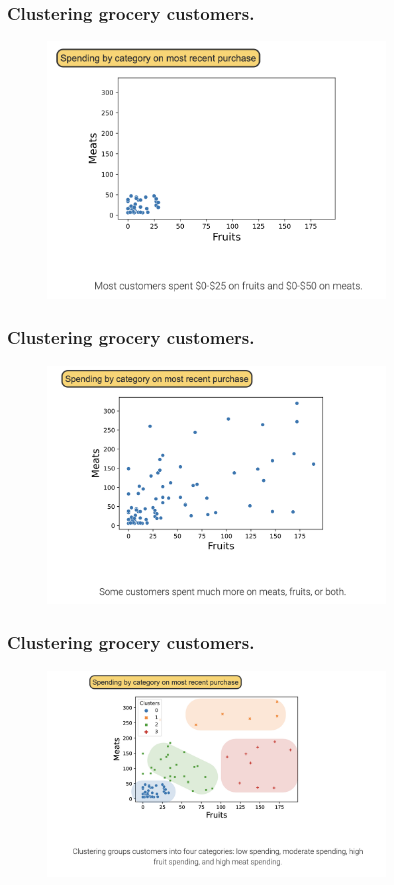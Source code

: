 \documentclass[10pt,dvipsnames]{beamer}
\begin{document}
\begin{frame}
    \frametitle{Clustering grocery customers.}
    \begin{figure}[ht]
        \centering
        \includegraphics[width=0.8\textwidth]{imgs/k_mean_2.png}
    \end{figure}
\end{frame}

\begin{frame}
    \frametitle{Clustering grocery customers.}
    \begin{figure}[ht]
        \centering
        \includegraphics[width=0.8\textwidth]{imgs/k_mean_3.png}
    \end{figure}
\end{frame}

\begin{frame}
    \frametitle{Clustering grocery customers.}
    \begin{figure}[ht]
        \centering
        \includegraphics[width=0.8\textwidth]{imgs/k_mean_4.png}
    \end{figure}
\end{frame}
\end{document}
